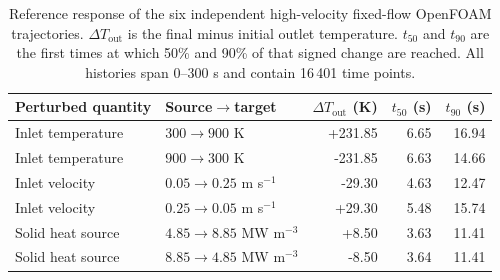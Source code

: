 \begin{table}[htbp]
\centering
\caption{Reference response of the six independent high-velocity fixed-flow OpenFOAM trajectories. $\Delta T_{\mathrm{out}}$ is the final minus initial outlet temperature. $t_{50}$ and $t_{90}$ are the first times at which 50\% and 90\% of that signed change are reached. All histories span 0--300 s and contain 16\,401 time points.}
\label{tab:high_re_reference_response}
\begin{tabular}{llrrr}
\toprule
Perturbed quantity & Source$\rightarrow$target & $\Delta T_{\mathrm{out}}$ (K) & $t_{50}$ (s) & $t_{90}$ (s) \\
\midrule
Inlet temperature & $300\rightarrow900$ K & +231.85 & 6.65 & 16.94 \\
Inlet temperature & $900\rightarrow300$ K & -231.85 & 6.63 & 14.66 \\
Inlet velocity & $0.05\rightarrow0.25$ m s$^{-1}$ & -29.30 & 4.63 & 12.47 \\
Inlet velocity & $0.25\rightarrow0.05$ m s$^{-1}$ & +29.30 & 5.48 & 15.74 \\
Solid heat source & $4.85\rightarrow8.85$ MW m$^{-3}$ & +8.50 & 3.63 & 11.41 \\
Solid heat source & $8.85\rightarrow4.85$ MW m$^{-3}$ & -8.50 & 3.64 & 11.41 \\
\bottomrule
\end{tabular}
\end{table}
